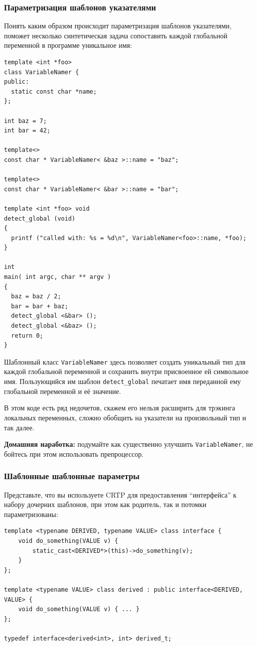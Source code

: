 \documentclass[a4paper,12pt,oneside]{article}
\begin{document}
\subsubsection{Параметризация шаблонов указателями}

Понять каким образом происходит параметризация шаблонов указателями, поможет несколько синтетическая задача сопоставить каждой глобальной переменной в программе уникальное имя:

\begin{lstlisting}
template <int *foo>
class VariableNamer {
public:
  static const char *name;
};

int baz = 7;
int bar = 42;

template<>
const char * VariableNamer< &baz >::name = "baz";

template<>
const char * VariableNamer< &bar >::name = "bar";

template <int *foo> void
detect_global (void)
{
  printf ("called with: %s = %d\n", VariableNamer<foo>::name, *foo);
}

int
main( int argc, char ** argv )
{
  baz = baz / 2;
  bar = bar + baz;
  detect_global <&bar> ();
  detect_global <&baz> ();
  return 0;
}
\end{lstlisting}

Шаблонный класс \lstinline!VariableNamer! здесь позволяет создать уникальный тип для каждой глобальной переменной и сохранить внутри присвоенное ей символьное имя. Пользующийся им шаблон \lstinline!detect_global! печатает имя переданной ему глобальной переменной и её значение.

В этом коде есть ряд недочетов, скажем его нельзя расширить для трэкинга локальных переменных, сложно обобщить на указатели на произвольный тип и так далее.

\textbf{Домашняя наработка:} подумайте как существенно улучшить \lstinline!VariableNamer!, не бойтесь при этом использовать препроцессор.

\subsubsection{Шаблонные шаблонные параметры}

Представьте, что вы используете CRTP для предоставления ``интерфейса'' к набору дочерних шаблонов, при этом как родитель, так и потомки параметризованы:

\begin{lstlisting}
template <typename DERIVED, typename VALUE> class interface {
    void do_something(VALUE v) {
        static_cast<DERIVED*>(this)->do_something(v);
    }
};

template <typename VALUE> class derived : public interface<DERIVED, VALUE> {
    void do_something(VALUE v) { ... }
};

typedef interface<derived<int>, int> derived_t;
\end{lstlisting}
\end{document}
